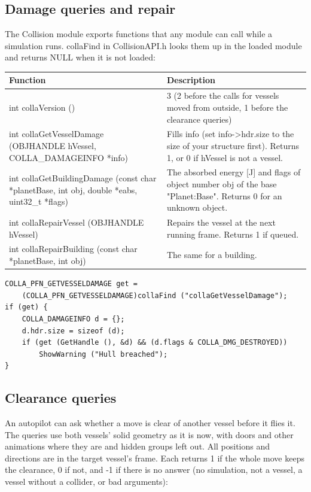 \documentclass[Orbiter Developer Manual.tex]{subfiles}
\begin{document}
\begin{sloppypar}
\subsection{Damage queries and repair}
The Collision module exports functions that any module can call while a simulation runs. collaFind in CollisionAPI.h looks them up in the loaded module and returns NULL when it is not loaded:

	\begin{longtable}{ |p{}|p{}| }
	\hline\rule{0pt}{2ex}
	\textbf{Function} & \textbf{Description}\\
	\hline\rule{0pt}{2ex}
	int collaVersion () & 3 (2 before the calls for vessels moved from outside, 1 before the clearance queries)\\
	\hline\rule{0pt}{2ex}
	int collaGetVesselDamage (OBJHANDLE hVessel, COLLA\_DAMAGEINFO *info) & Fills info (set info->hdr.size to the size of your structure first). Returns 1, or 0 if hVessel is not a vessel.\\
	\hline\rule{0pt}{2ex}
	int collaGetBuildingDamage (const char *planetBase, int obj, double *eabs, uint32\_t *flags) & The absorbed energy [J] and flags of object number obj of the base "Planet:Base". Returns 0 for an unknown object.\\
	\hline\rule{0pt}{2ex}
	int collaRepairVessel (OBJHANDLE hVessel) & Repairs the vessel at the next running frame. Returns 1 if queued.\\
	\hline\rule{0pt}{2ex}
	int collaRepairBuilding (const char *planetBase, int obj) & The same for a building.\\
	\hline
	\end{longtable}

\begin{lstlisting}
COLLA_PFN_GETVESSELDAMAGE get =
    (COLLA_PFN_GETVESSELDAMAGE)collaFind ("collaGetVesselDamage");
if (get) {
    COLLA_DAMAGEINFO d = {};
    d.hdr.size = sizeof (d);
    if (get (GetHandle (), &d) && (d.flags & COLLA_DMG_DESTROYED))
        ShowWarning ("Hull breached");
}
\end{lstlisting}


\subsection{Clearance queries}
An autopilot can ask whether a move is clear of another vessel before it flies it. The queries use both vessels' solid geometry as it is now, with doors and other animations where they are and hidden groups left out. All positions and directions are in the target vessel's frame. Each returns 1 if the whole move keeps the clearance, 0 if not, and -1 if there is no answer (no simulation, not a vessel, a vessel without a collider, or bad arguments):


\end{sloppypar}
\end{document}
